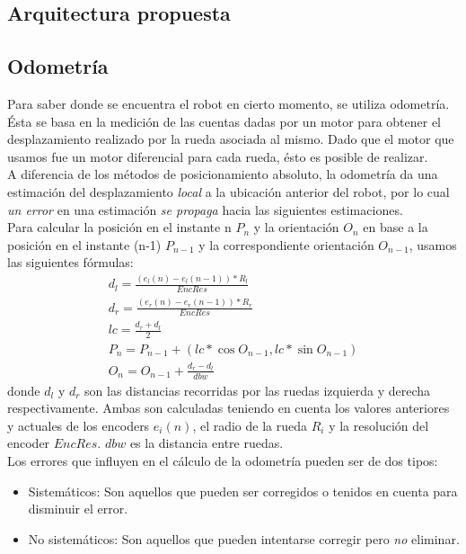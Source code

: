 \newpage
\subsection{Arquitectura propuesta}
\label{arq_prop}

\newpage


\newpage
\subsection{Odometr\'ia}
\label{odometry}
Para saber donde se encuentra el robot en cierto momento, se utiliza odometr\'ia.
\\
\'Esta se basa en la medici\'on de las cuentas dadas por un motor para obtener el desplazamiento realizado 
por la rueda asociada al mismo. Dado que el motor que usamos fue un motor diferencial para cada rueda,
\'esto es posible de realizar.
\\
A diferencia de los m\'etodos de posicionamiento absoluto, la odometr\'ia
da una estimaci\'on del desplazamiento \emph{local} a la ubicaci\'on anterior del robot, por lo cual \emph{un error}
en una estimaci\'on \emph{se propaga} hacia las siguientes estimaciones. 
\\
Para calcular la posici\'on en el instante n $P_n$ y la orientaci\'on $O_n$ en base a la posici\'on en el 
instante (n-1) $P_{n-1}$ y la correspondiente orientaci\'on $O_{n-1}$, usamos las siguientes f\'ormulas:
\begin{eqnarray}
d_l = \frac{(e_l(n) - e_l(n-1)) * R_l}{EncRes} \\
d_r = \frac{(e_r(n) - e_r(n-1)) * R_r}{EncRes} \\
lc = \frac{d_r + d_l}{2} \\
P_n = P_{n-1} + (lc * \cos{O_{n-1}},lc * \sin{O_{n-1}}) \\
O_n = O_{n-1} + \frac{d_r - d_l}{dbw}
\end{eqnarray}
donde $d_l$ y $d_r$ son las distancias recorridas por las ruedas izquierda y derecha respectivamente. Ambas
son calculadas teniendo en cuenta los valores anteriores y actuales de los encoders $e_i(n)$, el radio de la rueda $R_i$ y
la resoluci\'on del encoder $EncRes$. $dbw$ es la distancia entre ruedas.
\\
Los errores que influyen en el c\'alculo de la odometr\'ia pueden ser de dos tipos:

\begin{itemize}

\item{Sistem\'aticos:} Son aquellos que pueden ser corregidos o tenidos en cuenta para disminuir el error.

\item{No sistem\'aticos:} Son aquellos que pueden intentarse corregir pero \emph{no} eliminar.

\end{itemize}

